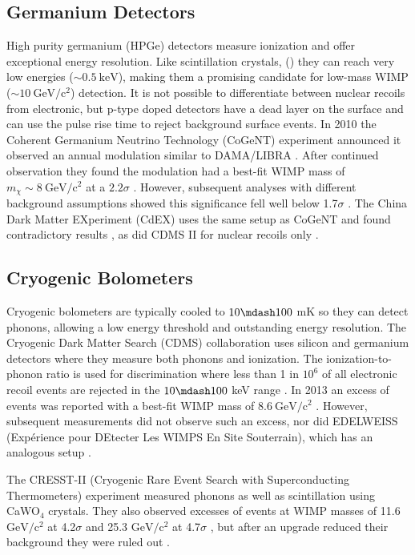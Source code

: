 \subsection{Germanium Detectors}
\label{subsec:germanium}
High purity germanium (HPGe) detectors measure ionization and offer exceptional energy resolution.  Like scintillation crystals,
() they can reach very low energies (${\sim} 0.5\ \mathrm{keV}$), making them a promising candidate for low-mass
WIMP (${\sim} 10\ \mathrm{GeV/c^2}$) detection.  It is not possible to differentiate between nuclear recoils from electronic, but
p-type doped detectors have a dead layer on the surface and can use the
pulse rise time to reject background surface events.  In 2010 the Coherent Germanium Neutrino Technology (CoGeNT) experiment
announced it observed an annual modulation similar to DAMA/LIBRA .  After continued observation they found the
modulation had a best-fit
WIMP mass of $m_{\chi}\sim 8\ \mathrm{GeV/c^2}$ at a $2.2\sigma$ .  However, subsequent analyses with
different
background assumptions showed this significance fell well below 1.7$\sigma$ .  The China Dark Matter
EXperiment (CdEX) uses the same setup as CoGeNT and found contradictory results , as did CDMS II for nuclear recoils
only .


\subsection{Cryogenic Bolometers}
\label{subsec:bolometers}
Cryogenic bolometers are typically cooled to $10 \mdash 100$ mK so they can detect phonons, allowing a low energy threshold and
outstanding energy resolution.  The Cryogenic Dark Matter Search (CDMS) collaboration uses silicon and germanium detectors where they
measure both phonons
and ionization.  The ionization-to-phonon ratio is used for discrimination where less than 1 in $10^{6}$ of all electronic recoil events
are rejected in the $10 \mdash 100$ keV range .  In 2013 an excess of events was reported with a best-fit
WIMP mass of $8.6\ \mathrm{GeV/c^2}$ .  However, subsequent measurements did not observe such an excess, nor did
EDELWEISS (Exp\'erience pour DEtecter Les WIMPS En Site Souterrain), which has an analogous setup .

The CRESST-II (Cryogenic Rare Event Search with Superconducting Thermometers) experiment measured phonons as well as scintillation using
CaWO$_{4}$ crystals.  They also observed excesses of
events at WIMP masses of 11.6 $\mathrm{GeV/c^2}$ at 4.2$\sigma$ and 25.3 $\mathrm{GeV/c^2}$ at 4.7$\sigma$ , but after
an upgrade reduced their background they were ruled out .



